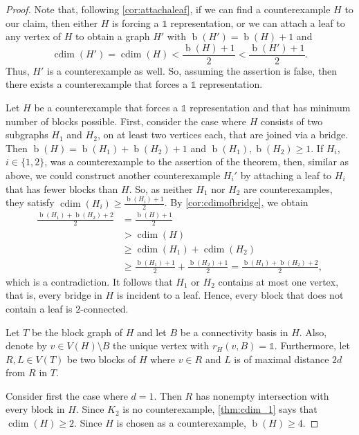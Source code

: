\documentclass[letterpaper,12pt,headings=normal,parskip=half]{scrartcl}
\DeclareMathOperator{\cdim}{cdim}
\DeclareMathOperator{\blocks}{\text{$b$}}
\theoremstyle{definition}
\begin{document}
\begin{proof}
    Note that, following \cref{cor:attachaleaf}, if we can find a counterexample $H$ to our claim, then either $H$ is forcing a $\mathds{1}$ representation, or we can attach a leaf to any vertex of $H$ to obtain a graph $H'$ with $\blocks(H')=\blocks(H)+1$ and
    \begin{equation*}
        \cdim(H')=\cdim(H)<\frac{\blocks(H)+1}{2}<\frac{\blocks(H')+1}{2}.
    \end{equation*}
    Thus, $H'$ is a counterexample as well.
    So, assuming the assertion is false, then there exists a counterexample that forces a $\mathds{1}$ representation.
    
    Let $H$ be a counterexample that forces a $\mathds{1}$ representation and that has minimum number of blocks possible.
    First, consider the case where $H$ consists of two subgraphs $H_1$ and $H_2$, on at least two vertices each, that are joined via a bridge.
    Then $\blocks(H)=\blocks(H_1)+\blocks(H_2)+1$ and $\blocks(H_1),\blocks(H_2)\geq1$.
    If $H_i$, $i\in\{1,2\}$, was a counterexample to the assertion of the theorem, then, similar as above, we could construct another counterexample $H_i'$ by attaching a leaf to $H_i$ that has fewer blocks than $H$.
    So, as neither $H_1$ nor $H_2$ are counterexamples, they satisfy $\cdim(H_i)\geq\frac{\blocks(H_i)+1}{2}$.
    By \cref{cor:cdimofbridge}, we obtain
    \begin{align*}
    \frac{\blocks(H_1)+\blocks(H_2)+2}{2} &= \frac{\blocks(H)+1}{2} \\[0.5ex]
    &>\cdim(H) \\[1.5ex]
    &\geq\cdim(H_1)+\cdim(H_2)\\[0.5ex]
    &\geq\frac{\blocks(H_1)+1}{2}+\frac{\blocks(H_2)+1}{2}=\frac{\blocks(H_1)+\blocks(H_2)+2}{2},
    \end{align*}
    which is a contradiction.
    It follows that $H_1$ or $H_2$ contains at most one vertex, that is, every bridge in $H$ is incident to a leaf.
    Hence, every block that does not contain a leaf is \mbox{$2$-connected}.
 
    Let $T$ be the block graph of $H$ and let $B$ be a connectivity basis in $H$.
    Also, denote by $v\in V(H)\setminus B$ the unique vertex with $r_H(v,B)=\mathds{1}$.
    Furthermore, let $R,L\in V(T)$ be two blocks of $H$ where $v\in R$ and $L$ is of maximal distance $2d$ from $R$ in $T$.
    
    Consider first the case where $d=1$.
    Then $R$ has nonempty intersection with every block in $H$.
    Since $K_2$ is no counterexample, \cref{thm:cdim_1} says that $\cdim(H)\geq2$.
    Since $H$ is chosen as a counterexample, $\blocks(H)\geq 4$.
    

\end{proof}
\end{document}
